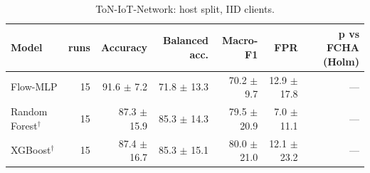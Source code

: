 \begin{table}[t]
\centering
\caption{ToN-IoT-Network: host split, IID clients.}
\label{tab:ton_iot_network_host}
\begin{tabular}{lrrrrrr}
\toprule
Model & runs & Accuracy & Balanced acc. & Macro-F1 & FPR & p vs FCHA (Holm) \\
\midrule
Flow-MLP & 15 & 91.6 $\pm$ 7.2 & 71.8 $\pm$ 13.3 & 70.2 $\pm$ 9.7 & 12.9 $\pm$ 17.8 & — \\
Random Forest$^\dagger$ & 15 & 87.3 $\pm$ 15.9 & 85.3 $\pm$ 14.3 & 79.5 $\pm$ 20.9 & 7.0 $\pm$ 11.1 & — \\
XGBoost$^\dagger$ & 15 & 87.4 $\pm$ 16.7 & 85.3 $\pm$ 15.1 & 80.0 $\pm$ 21.0 & 12.1 $\pm$ 23.2 & — \\
\bottomrule
\end{tabular}
\end{table}